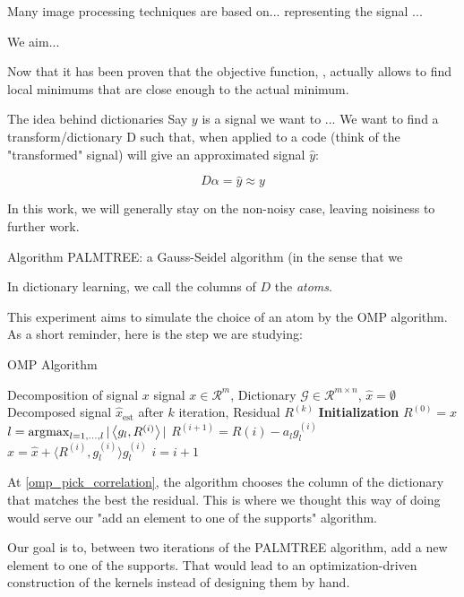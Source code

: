 Many image processing techniques are based on... representing the signal ...

We aim... 

Now that it has been proven that the objective function, , actually allows to find local minimums that are close enough to the actual minimum.


The idea behind dictionaries
Say $y$ is a signal we want to ...
We want to find a transform/dictionary D such that, when applied to a code (think of the "transformed" signal) will give an approximated signal $\hat{y}$:

$$D\alpha=\hat{y} \approx y$$

In this work, we will generally stay on the non-noisy case, leaving noisiness to further work.

Algorithm PALMTREE: a Gauss-Seidel algorithm (in the sense that we 

In dictionary learning, we call the columns of $D$ the \emph{atoms}.


This experiment aims to simulate the choice of an atom by the OMP algorithm. As a short reminder, here is the step we are studying:
\begin{algorithm}
    \caption{OMP Algorithm}
  \begin{algorithmic}[1]
    \Require Decomposition of signal $x$
    \Input signal $x \in \mathcal{R}^{m}$, Dictionary $\mathcal{G} \in \mathcal{R}^{m \times n}$, $\hat{x} = \emptyset$
    \Output Decomposed signal $\hat{x}_{\text{est}}$ after $k$ iteration, Residual $R^{(k)}$
    \State \textbf{Initialization} $R^{(0)} = x$
      \State $l =  \operatorname*{\arg\!\max}_{l = 1,\dots,l} |\left< g_l,R^{(i)} \right>|$ \label{omp_pick_correlation}
      \State $R^{(i+1)} = R{(i)}-a_l g_l^{(i)}$
      \State $\hat{x} = \hat{x}+\langle R^{(i)}, g_{l}^{(i)} \rangle g_{l}^{(i)}$
      \State $i = i + 1$
    \EndWhile
  \end{algorithmic}
\end{algorithm}

At \cref{omp_pick_correlation}, the algorithm chooses the column of the dictionary that matches the best the residual. This is where we thought this way of doing would serve our "add an element to one of the supports" algorithm.

Our goal is to, between two iterations of the PALMTREE algorithm, add a new element to one of the supports. That would lead to an optimization-driven construction of the kernels instead of designing them by hand.

